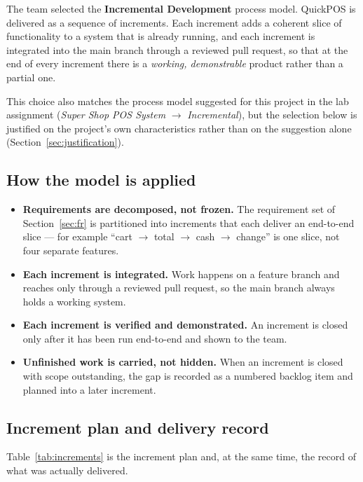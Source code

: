 \documentclass[11pt,a4paper]{article}
\newcommand{\filep}[1]{\texttt{\small\color{navy}\detokenize{#1}}}
\begin{document}
The team selected the \textbf{Incremental Development} process model. QuickPOS is delivered
as a sequence of increments. Each increment adds a coherent slice of functionality to a
system that is already running, and each increment is integrated into the main branch
through a reviewed pull request, so that at the end of every increment there is a
\emph{working, demonstrable} product rather than a partial one.

This choice also matches the process model suggested for this project in the lab
assignment (\emph{Super Shop POS System} $\rightarrow$ \emph{Incremental}), but the selection
below is justified on the project's own characteristics rather than on the suggestion alone
(Section~\ref{sec:justification}).

\subsection{How the model is applied}

\begin{itemize}
  \item \textbf{Requirements are decomposed, not frozen.} The requirement set of
        Section~\ref{sec:fr} is partitioned into increments that each deliver an end-to-end
        slice --- for example ``cart $\rightarrow$ total $\rightarrow$ cash $\rightarrow$
        change'' is one slice, not four separate features.
  \item \textbf{Each increment is integrated.} Work happens on a feature branch and reaches
        \filep{main} only through a reviewed pull request, so the main branch always holds a
        working system.
  \item \textbf{Each increment is verified and demonstrated.} An increment is closed only
        after it has been run end-to-end and shown to the team.
  \item \textbf{Unfinished work is carried, not hidden.} When an increment is closed with
        scope outstanding, the gap is recorded as a numbered backlog item and planned into a
        later increment.
\end{itemize}

\subsection{Increment plan and delivery record}

Table~\ref{tab:increments} is the increment plan and, at the same time, the record of what
was actually delivered.
\end{document}
